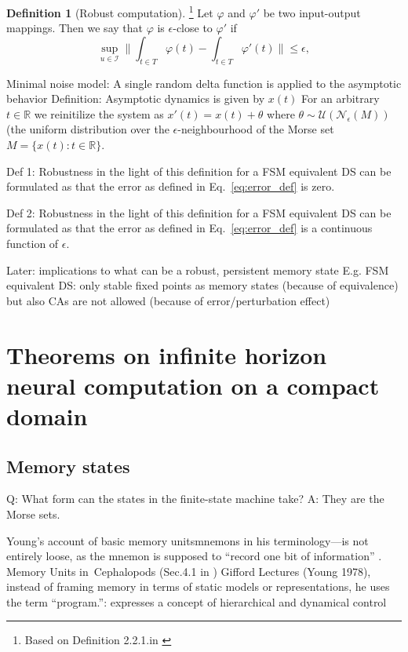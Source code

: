 \documentclass{scrartcl}
\theoremstyle{definition}
\newtheorem{definition}{Definition}
\theoremstyle{remark}
\newcommand{\reals}{\mathbb{R}}
\begin{document}
\begin{definition}[Robust computation]\footnote{Based on Definition 2.2.1.in \citep{kuehn2015}}
 Let $\varphi$ and $\varphi'$ be two input-output mappings.
  Then we say that $\varphi$ is $\epsilon$-close to $\varphi'$ if
\begin{equation}\label{eq:error_def}
\sup_{u\in \mathcal{I}}\|\int_{t\in T}\varphi(t) - \int_{t\in T}\varphi'(t)\|  \leq \epsilon,
\end{equation}
\end{definition}


Minimal noise model: 
A single random delta function is applied to the asymptotic behavior
Definition:
Asymptotic dynamics is given by $x(t)$
For an arbitrary $t \in \reals$ we reinitilize the system as $x'(t)=x(t) + \theta$ where $\theta\sim \mathcal{U}(\mathcal{N}_\epsilon(M))$ (the uniform distribution over the $\epsilon$-neighbourhood of the Morse set $M=\{x(t)\colon t\in \reals\}$.

Def 1: Robustness in the light of this definition for a FSM equivalent DS can be formulated as that the error as defined in Eq.~\ref{eq:error_def} is zero.

Def 2: Robustness in the light of this definition for a FSM equivalent DS can be formulated as that the error as defined in Eq.~\ref{eq:error_def} is a continuous function of $\epsilon$.

Later: implications to what can be a robust, persistent memory state
E.g.  FSM equivalent DS: only stable fixed points as memory states (because of equivalence)
but also CAs are not allowed (because of error/perturbation effect)


\section{Theorems on infinite horizon neural computation on a compact domain}\label{sec:theorems}


\subsection{Memory states}%
Q: What form can the states in the finite-state machine take?
A: They are the Morse sets.

Young’s account of basic memory unitsmnemons in his terminology—is not entirely loose, as the mnemon is supposed to “record one bit of information” \citep{young1978}. %
Memory Units in Cephalopods (Sec.4.1 in \citep{milkowski2018})
Gifford Lectures (Young 1978), instead of framing memory in terms of static models or representations, he uses the term “program.”: expresses a concept of hierarchical and dynamical control
\end{document}
